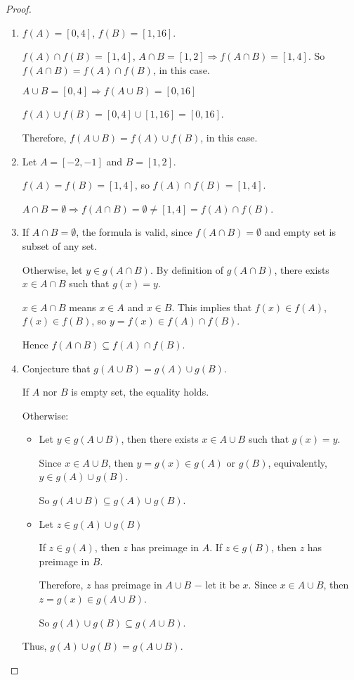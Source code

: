 \documentclass[class=understanding-analysis,crop=false]{standalone}
\begin{document}
\begin{proof}
    \begin{enumerate}[label = (\alph*)]
        \item $f(A) = [0, 4]$, $f(B) = [1, 16]$.
              \par $f(A)\cap f(B) = [1, 4]$, $A\cap B = [1, 2]\Rightarrow f(A\cap B) = [1, 4]$. So $f(A\cap B) = f(A)\cap f(B)$, in this case.
              \par $A\cup B = [0, 4]\Rightarrow f(A\cup B) = [0, 16]$
              \par $f(A)\cup f(B) = [0, 4]\cup [1, 16] = [0, 16]$.
              \par Therefore, $f(A\cup B) = f(A)\cup f(B)$, in this case.
        \item Let $A = [-2, -1]$ and $B = [1, 2]$.
              \par $f(A) = f(B) = [1, 4]$, so $f(A)\cap f(B) = [1, 4]$.
              \par $A\cap B = \emptyset\Rightarrow f(A\cap B) = \emptyset\ne [1, 4] = f(A)\cap f(B)$.
        \item If $A\cap B = \emptyset$, the formula is valid, since $f(A\cap B) = \emptyset$ and empty set is subset of any set.
              \par Otherwise, let $y\in g(A\cap B)$. By definition of $g(A\cap B)$, there exists $x\in A\cap B$ such that $g(x) = y$.
              \par $x\in A\cap B$ means $x\in A$ and $x\in B$. This implies that $f(x)\in f(A)$, $f(x)\in f(B)$, so $y = f(x) \in f(A)\cap f(B)$.
              \par Hence $f(A\cap B)\subseteq f(A)\cap f(B)$.
        \item Conjecture that $g(A\cup B) = g(A)\cup g(B)$.
              \par If $A$ nor $B$ is empty set, the equality holds.
              \par Otherwise:
              \begin{itemize}
                  \item Let $y\in g(A\cup B)$, then there exists $x\in A\cup B$ such that $g(x) = y$.
                        \par Since $x\in A\cup B$, then $y = g(x) \in g(A)$ or $g(B)$, equivalently, $y\in g(A)\cup g(B)$.
                        \par So $g(A\cup B)\subseteq g(A)\cup g(B)$.
                  \item Let $z\in g(A)\cup g(B)$
                        \par If $z\in g(A)$, then $z$ has preimage in $A$. If $z\in g(B)$, then $z$ has preimage in $B$.
                        \par Therefore, $z$ has preimage in $A\cup B$ $-$ let it be $x$. Since $x\in A\cup B$, then $z = g(x)\in g(A\cup B)$.
                        \par So $g(A)\cup g(B)\subseteq g(A\cup B)$.
              \end{itemize}
              \par Thus, $g(A)\cup g(B) = g(A\cup B)$.
    \end{enumerate}
\end{proof}
\end{document}
